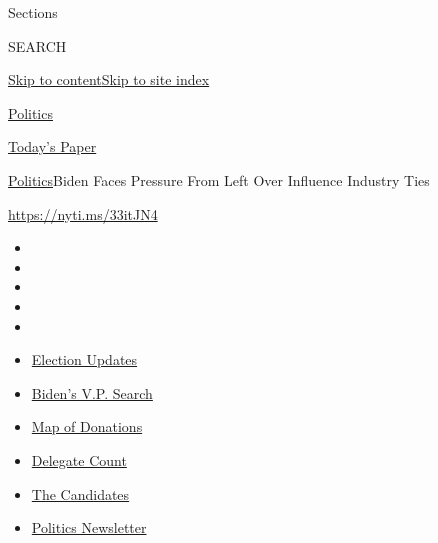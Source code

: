 Sections

SEARCH

\protect\hyperlink{site-content}{Skip to
content}\protect\hyperlink{site-index}{Skip to site index}

\href{https://www.nytimes.com/section/politics}{Politics}

\href{https://myaccount.nytimes.com/auth/login?response_type=cookie\&client_id=vi}{}

\href{https://www.nytimes.com/section/todayspaper}{Today's Paper}

\href{/section/politics}{Politics}\textbar{}Biden Faces Pressure From
Left Over Influence Industry Ties

\url{https://nyti.ms/33itJN4}

\begin{itemize}
\item
\item
\item
\item
\item
\end{itemize}

\begin{itemize}
\item
  \href{https://www.nytimes.com/2020/07/31/us/elections/biden-vs-trump.html?action=click\&pgtype=Article\&state=default\&region=TOP_BANNER\&context=storylines_menu}{Election
  Updates}
\item
  \href{https://www.nytimes.com/article/biden-vice-president-2020.html?action=click\&pgtype=Article\&state=default\&region=TOP_BANNER\&context=storylines_menu}{Biden's
  V.P. Search}
\item
  \href{https://www.nytimes.com/interactive/2020/07/24/us/politics/trump-biden-campaign-donors.html?action=click\&pgtype=Article\&state=default\&region=TOP_BANNER\&context=storylines_menu}{Map
  of Donations}
\item
  \href{https://www.nytimes.com/interactive/2020/us/elections/delegate-count-primary-results.html?action=click\&pgtype=Article\&state=default\&region=TOP_BANNER\&context=storylines_menu}{Delegate
  Count}
\item
  \href{https://www.nytimes.com/interactive/2019/us/politics/2020-presidential-candidates.html?action=click\&pgtype=Article\&state=default\&region=TOP_BANNER\&context=storylines_menu}{The
  Candidates}
\item
  \href{https://www.nytimes.com/newsletters/politics?action=click\&pgtype=Article\&state=default\&region=TOP_BANNER\&context=storylines_menu}{Politics
  Newsletter}
\end{itemize}

